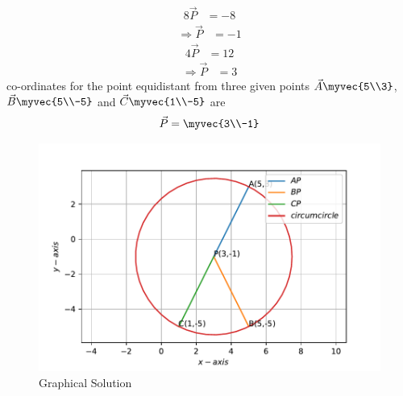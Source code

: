 \documentclass[journal,12pt,twocolumn]{IEEEtran}
\begin{document}
    \begin{align}
        8 \vec{P}&=-8
    \end{align}
    \begin{align}
         \Longrightarrow \vec{P}&=-1
    \end{align}
    \begin{align}
        4 \vec{P}&=12
    \end{align}
    \begin{align}
         \Longrightarrow \vec{P}&=3
    \end{align}
        co-ordinates for the point equidistant from three given  points $\vec{A}\myvec{5\\3}$, $\vec{B}\myvec{5\\-5}$ and $\vec{C}\myvec{1\\-5}$ are 
    \begin{align}
        \vec{P}  = \myvec{3\\-1}
    \end{align} 
 \begin{figure}
    \centering
    \includegraphics[width=\columnwidth]{equidistant point circumcircle.pdf}
    \caption{Graphical Solution}
    \label{fig:my_label}
\end{figure}\\
\end{document}
